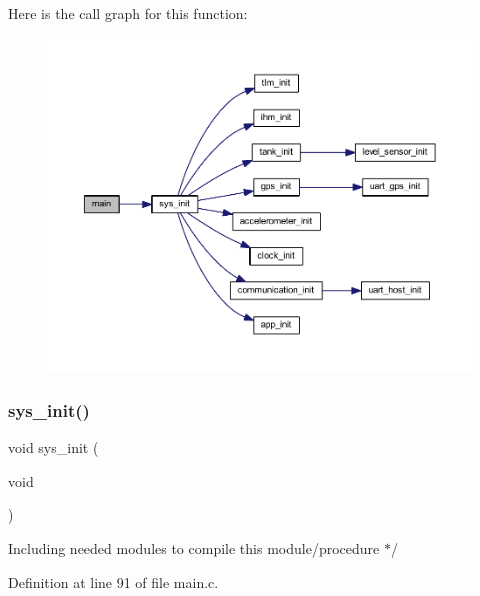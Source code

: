 Here is the call graph for this function\+:
\nopagebreak
\begin{figure}[H]
\begin{center}
\leavevmode
\includegraphics[width=350pt]{group__main__module_ga840291bc02cba5474a4cb46a9b9566fe_cgraph}
\end{center}
\end{figure}
\mbox{\label{group__main__module_gaf411a8bc6b7ed4b0af9114e10c959448}} 
\subsubsection{\texorpdfstring{sys\+\_\+init()}{sys\_init()}}
{\footnotesize\ttfamily void sys\+\_\+init (\begin{DoxyParamCaption}\item[{void}]{ }\end{DoxyParamCaption})}


\begin{DoxyItemize}
\item Including needed modules to compile this module/procedure $\ast$/ 
\end{DoxyItemize}

Definition at line 91 of file main.\+c.


